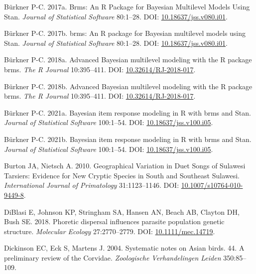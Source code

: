 \documentclass[10pt,a4paper]{article}
\newlength{\cslhangindent}
\newenvironment{CSLReferences}[2] %
 {\begin{list}{}{%
  \setlength{\itemindent}{0pt}
  \setlength{\leftmargin}{0pt}
  \setlength{\parsep}{0pt}
  \ifodd #1
   \setlength{\leftmargin}{\cslhangindent}
   \setlength{\itemindent}{-1\cslhangindent}
  \fi
  \setlength{\itemsep}{#2\baselineskip}}}
 {\end{list}}
\begin{document}
\begin{CSLReferences}{1}{0}
Bürkner P-C. 2017a. Brms: {An} {R} {Package} for {Bayesian} {Multilevel} {Models} {Using} {Stan}. \emph{Journal of Statistical Software} 80:1--28. DOI: \href{https://doi.org/10.18637/jss.v080.i01}{10.18637/jss.v080.i01}.

Bürkner P-C. 2017b. {brms}: An {R} package for {Bayesian} multilevel models using {Stan}. \emph{Journal of Statistical Software} 80:1--28. DOI: \href{https://doi.org/10.18637/jss.v080.i01}{10.18637/jss.v080.i01}.

Bürkner P-C. 2018a. Advanced {Bayesian} multilevel modeling with the {R} package {brms}. \emph{The R Journal} 10:395--411. DOI: \href{https://doi.org/10.32614/RJ-2018-017}{10.32614/RJ-2018-017}.

Bürkner P-C. 2018b. Advanced {Bayesian} multilevel modeling with the {R} package {brms}. \emph{The R Journal} 10:395--411. DOI: \href{https://doi.org/10.32614/RJ-2018-017}{10.32614/RJ-2018-017}.

Bürkner P-C. 2021a. Bayesian item response modeling in {R} with {brms} and {Stan}. \emph{Journal of Statistical Software} 100:1--54. DOI: \href{https://doi.org/10.18637/jss.v100.i05}{10.18637/jss.v100.i05}.

Bürkner P-C. 2021b. Bayesian item response modeling in {R} with {brms} and {Stan}. \emph{Journal of Statistical Software} 100:1--54. DOI: \href{https://doi.org/10.18637/jss.v100.i05}{10.18637/jss.v100.i05}.

Burton JA, Nietsch A. 2010. Geographical {Variation} in {Duet} {Songs} of {Sulawesi} {Tarsiers}: {Evidence} for {New} {Cryptic} {Species} in {South} and {Southeast} {Sulawesi}. \emph{International Journal of Primatology} 31:1123--1146. DOI: \href{https://doi.org/10.1007/s10764-010-9449-8}{10.1007/s10764-010-9449-8}.

DiBlasi E, Johnson KP, Stringham SA, Hansen AN, Beach AB, Clayton DH, Bush SE. 2018. Phoretic dispersal influences parasite population genetic structure. \emph{Molecular Ecology} 27:2770--2779. DOI: \href{https://doi.org/10.1111/mec.14719}{10.1111/mec.14719}.

Dickinson EC, Eck S, Martens J. 2004. Systematic notes on {Asian} birds. 44. {A} preliminary review of the {Corvidae}. \emph{Zoologische Verhandelingen Leiden} 350:85--109.


\end{CSLReferences}
\end{document}
